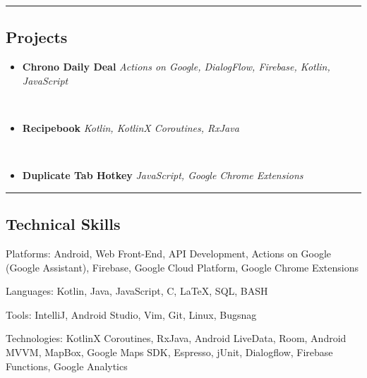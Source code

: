 \documentclass[9pt,letterpaper]{article}
\newenvironment{indentsection}[1]%
{\begin{list}{}%
	{\setlength{\leftmargin}{#1}}%
	\item[]%
}
{\end{list}}
\newcommand{\CPP}
{C\nolinebreak[4]\hspace{-.05em}\raisebox{.22ex}{\footnotesize\bf ++}}
\begin{document}
\hrule
\vspace{-0.4em}
\subsection*{Projects}

\begin{itemize}
	\parskip=0.1em

	\item {\textbf{Chrono Daily Deal}} \hfill
	{\emph{Actions on Google, DialogFlow, Firebase, Kotlin, JavaScript}}
	\\
	\item {\textbf{Recipebook}} \hfill
	{\emph{Kotlin, KotlinX Coroutines, RxJava}}
	\\
	\item {\textbf{Duplicate Tab Hotkey}} \hfill
	{\emph{JavaScript, Google Chrome Extensions}}
\end{itemize}


\hrule
\vspace{-0.4em}
\subsection*{Technical Skills}

\begin{indentsection}{\parindent}
\begin{description*}
	\item[Platforms:]
	Android, Web Front-End, API Development, Actions on Google (Google Assistant), Firebase, Google Cloud Platform, Google Chrome Extensions
	\item[Languages:]
	Kotlin, Java, JavaScript, \CPP, \LaTeX, SQL, BASH
	\item[Tools:]
	IntelliJ, Android Studio, Vim, Git, Linux, Bugsnag
	\item[Technologies:]
	KotlinX Coroutines, RxJava, Android LiveData, Room, Android MVVM, MapBox, Google Maps SDK, Espresso, jUnit, Dialogflow, Firebase Functions, Google Analytics
\end{description*}
\end{indentsection}
\end{document}
